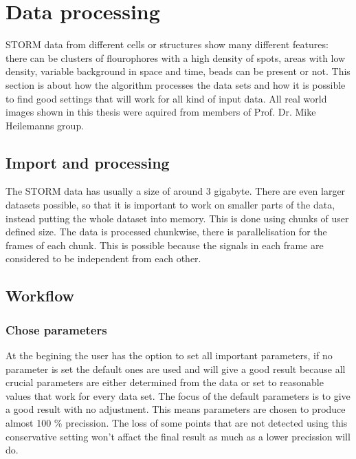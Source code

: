 \chapter{Data processing}
STORM data from different cells or structures show many different features: there can be clusters of flourophores with a high density of spots, areas with low density, variable background in space and time, beads can be present or not. This section is about how the algorithm processes the data sets and how it is possible to find good settings that will work for all kind of input data.\newline
All real world images shown in this thesis were aquired from members of Prof. Dr. Mike Heilemanns group.


\section{Import and processing}
The STORM data has usually a size of around 3 gigabyte. There are even larger datasets possible, so that it is important to work on smaller parts of the data, instead putting the whole dataset into memory. This is done using chunks of user defined size. The data is processed chunkwise, there is parallelisation for the frames of each chunk. This is possible because the signals in each frame are considered to be independent from each other.  

\section{Workflow}
\subsection{Chose parameters}
At the begining the user has the option to set all important parameters, if no parameter is set the default ones are used and will give a good result because all crucial parameters are either determined from the data or set to reasonable values that work for every data set. The focus of the default parameters is to give a good result with no adjustment. This means parameters are chosen to produce almost 100 \% precission. The loss of some points that are not detected using this conservative setting won't affact the final result as much as a lower precission will do.
